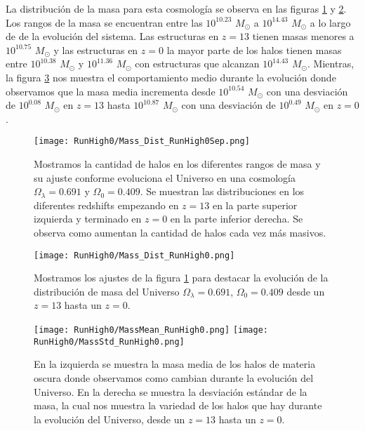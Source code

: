 La distribución de la masa para esta cosmología se observa en las figuras \ref{fig:High0-MassDistSep} y \ref{fig:High0-MassDist}. Los rangos de la masa se encuentran entre las $10^{10.23}$ $M_\odot$ a $10^{14.43}$ $M_\odot$ a lo largo de de la evolución del sistema. Las estructuras en $z=13$ tienen masas menores a $10^{10.75}$ $M_\odot$ y las estructuras en $z=0$ la mayor parte de los halos tienen masas entre $10^{10.38}$ $M_\odot$ y $10^{11.36}$ $M_\odot$ con estructuras que alcanzan $10^{14.43}$ $M_\odot$. Mientras, la figura \ref{fig:High0-MassStats} nos muestra el comportamiento medio durante la evolución donde observamos que la masa media incrementa desde $10^{10.54}$ $M_\odot$ con una desviación de $10^{0.08}$ $M_\odot$ en $z=13$ hasta $10^{10.87}$ $M_\odot$ con una desviación de $10^{0.49}$ $M_\odot$ en $z=0$.

\begin{figure}[H]
    \centering
    \texttt{[image: RunHigh0/Mass\_Dist\_RunHigh0Sep.png]}
    \caption[Distribución de masa]{\footnotesize Mostramos la cantidad de halos en los diferentes rangos de masa y su ajuste conforme evoluciona el Universo en una cosmología $\Omega_\lambda = 0.691$ y $\Omega_0 = 0.409$. Se muestran las distribuciones en los diferentes redshifts empezando en $z=13$ en la parte superior izquierda y terminado en $z=0$ en la parte inferior derecha. Se observa como aumentan la cantidad de halos cada vez más masivos.}
    \label{fig:High0-MassDistSep}
\end{figure}

\begin{figure}[H]
    \centering
    \texttt{[image: RunHigh0/Mass\_Dist\_RunHigh0.png]}
    \caption[Comparación de distribución de masa]{\footnotesize Mostramos los ajustes de la figura \ref{fig:High0-MassDistSep} para destacar la evolución de la distribución de masa del Universo $\Omega_\lambda = 0.691$, $\Omega_0 = 0.409$ desde un $z=13$ hasta un $z=0$.}
    \label{fig:High0-MassDist}
\end{figure}

\begin{figure}[H]
    \centering
    \texttt{[image: RunHigh0/MassMean\_RunHigh0.png]}
    \texttt{[image: RunHigh0/MassStd\_RunHigh0.png]}
    \caption[Media y desviación estándar de la distribución de masa]{\footnotesize En la izquierda se muestra la masa media de los halos de materia oscura donde observamos como cambian durante la evolución del Universo. En la derecha se muestra la desviación estándar de la masa, la cual nos muestra la variedad de los halos que hay durante la evolución del Universo, desde un $z=13$ hasta un $z=0$.}
    \label{fig:High0-MassStats}
\end{figure}

